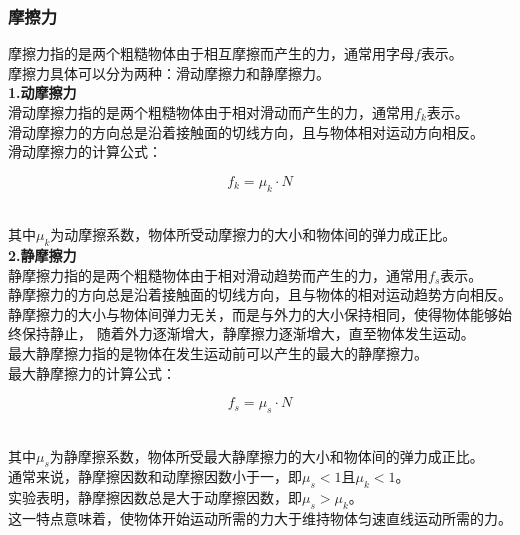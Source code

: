 \documentclass[UTF8]{ctexart}
\begin{document}
\subsubsection{摩擦力}
    摩擦力指的是两个粗糙物体由于相互摩擦而产生的力，通常用字母$f$表示。\\[3mm]
    摩擦力具体可以分为两种：滑动摩擦力和静摩擦力。\\[3mm]
    \textbf{1.动摩擦力}\\[2mm]
    滑动摩擦力指的是两个粗糙物体由于相对滑动而产生的力，通常用$f_k$表示。\\[3mm]
    滑动摩擦力的方向总是沿着接触面的切线方向，且与物体相对运动方向相反。\\[3mm]
    滑动摩擦力的计算公式：
    \begin{large}
        \begin{equation*}
            f_{k}=\mu_k\cdot N
        \end{equation*}
    \end{large}\\
    其中$\mu_k$为动摩擦系数，物体所受动摩擦力的大小和物体间的弹力成正比。\\[8mm]
    \textbf{2.静摩擦力}\\[2mm]
    静摩擦力指的是两个粗糙物体由于相对滑动趋势而产生的力，通常用$f_s$表示。\\[3mm]
    静摩擦力的方向总是沿着接触面的切线方向，且与物体的相对运动趋势方向相反。\\[3mm]
    静摩擦力的大小与物体间弹力无关，而是与外力的大小保持相同，使得物体能够始终保持静止，
    随着外力逐渐增大，静摩擦力逐渐增大，直至物体发生运动。\\[3mm]
    最大静摩擦力指的是物体在发生运动前可以产生的最大的静摩擦力。\\[3mm]
    最大静摩擦力的计算公式：
    \begin{large}
        \begin{equation*}
            f_{s}=\mu_{s}\cdot N
        \end{equation*}
    \end{large}\\
    其中$\mu_s$为静摩擦系数，物体所受最大静摩擦力的大小和物体间的弹力成正比。\\[6mm]
    通常来说，静摩擦因数和动摩擦因数小于一，即$\mu_s<1$且$\mu_k<1$。\\[3mm]
    实验表明，静摩擦因数总是大于动摩擦因数，即$\mu_s>\mu_k$。\\[3mm]
    这一特点意味着，使物体开始运动所需的力大于维持物体匀速直线运动所需的力。
\end{document}
